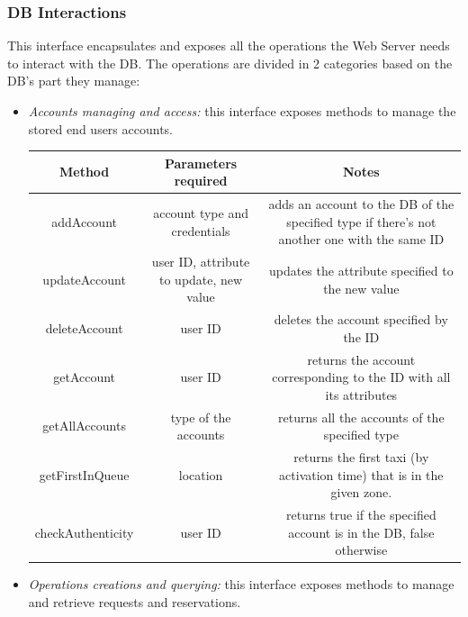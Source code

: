 \documentclass{article}
\begin{document}
	\subsubsection{DB Interactions}
	This interface encapsulates and exposes all the operations the Web Server needs to interact with the DB\@. The operations are divided in 2 categories based on the DB's part they manage:
	\begin{itemize}	
		\item \textit{Accounts managing and access:} this interface exposes methods to manage the stored end users accounts.\\	
		\begin{table}[H]
			\begin{adjustbox}{width=1.2\textwidth}
				\begin{tabular}{*{3}{c}}
					\toprule
					Method & Parameters required & Notes \\
					\midrule
					addAccount & account type and credentials & adds an account to the DB of the specified type if there's not another one with the same ID\\
					updateAccount & user ID, attribute to update, new value & updates the attribute specified to the new value\\ 
					deleteAccount & user ID & deletes the account specified by the ID \\
					getAccount & user ID & returns the account corresponding to the ID with all its attributes \\
					getAllAccounts & type of the accounts & returns all the accounts of the specified type \\
					getFirstInQueue & location & returns the first taxi (by activation time) that is in the given zone.\\
					checkAuthenticity & user ID & returns true if the specified account is in the DB, false otherwise \\
					\bottomrule
				\end{tabular}	
			\end{adjustbox}
		\end{table}
		\item \textit{Operations creations and querying:} this interface exposes methods to manage and retrieve requests and reservations.\\	
		\begin{table}[H]
			\begin{adjustbox}{width=1.2\textwidth}
				\begin{tabular}{*{3}{c}}
					\toprule

\end{tabular}
\end{adjustbox}
\end{table}
\end{itemize}
\end{document}
